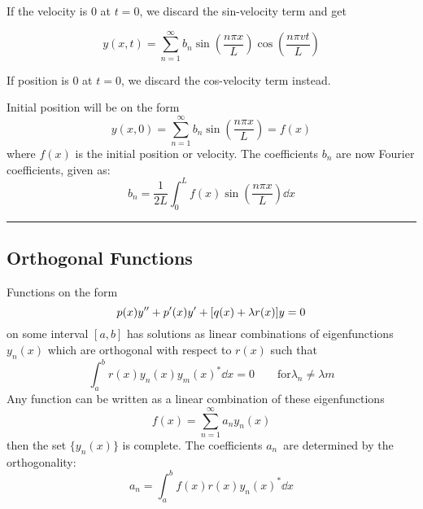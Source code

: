 \documentclass[10pt,a4paper]{article}
\newcommand{\oneinfsum}{\sum_{n=1}^{\infty}}
\newcommand{\holine}{\rule{286pt}{1pt}}
\begin{document}
\begin{multicols}{2}
If the velocity is 0 at $t=0$, we discard the sin-velocity term and get

\[
    y(x,t) = \oneinfsum b_n\sin(\frac{n\pi x}{L})\cos(\frac{n\pi v t}{L})
\]

If position is 0 at $t=0$, we discard the cos-velocity term instead.

Initial position will be on the form
\[
    y(x,0) = \oneinfsum b_n \sin(\frac{n\pi x}{L}) = f(x)
\]
where $f(x)$ is the initial position or velocity. The coefficients $b_n$ are now Fourier coefficients, given as:
\[
    b_n = \frac{1}{2L}\int_{0}^{L} f(x)\sin(\frac{n\pi x}{L}) \dd{x}
\]



\holine
\subsection*{Orthogonal Functions}
Functions on the form
\[
    p(x)y'' + p'(x)y' + \qty[q(x) + \lambda r(x)]y = 0
\]
on some interval $[a,b]$ has solutions as linear combinations of eigenfunctions $y_n(x)$ which are orthogonal with respect to $r(x)$ such that
\[
    \int_a^b r(x)y_n(x)y_m(x)^* \dd{x} = 0 \quad\quad \text{for} \lambda_n \neq \lambda{m}
\]
Any function can be written as a linear combination of these eigenfunctions
\[
    f(x) = \sum_{n=1}^\infty a_n y_n(x)
\]
then the set $\{y_n(x)\}$ is complete. The coefficients $a_n$ are determined by the orthogonality:
\[
    a_n = \int_a^b f(x)r(x)y_n(x)^* \dd{x}
\]


\newpage





\end{multicols}
\end{document}
